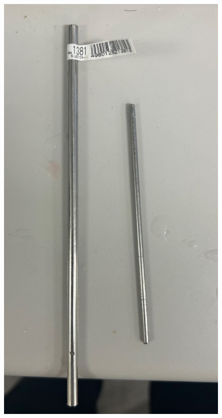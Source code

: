\begin{figure}
  \begin{minipage}[b]{0.29\hsize}
    \centering
    \includegraphics[scale=0.1]{pic/tetubou.jpg}
  

\end{minipage}
\end{figure}
